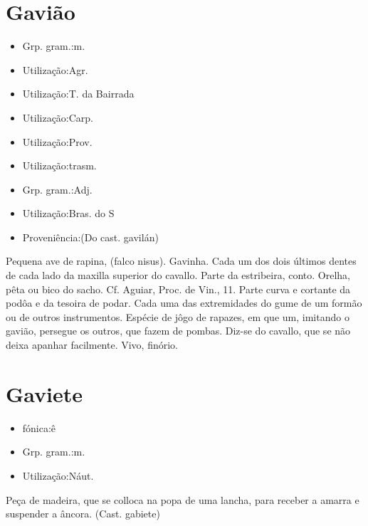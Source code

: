 \section{Gavião}
\begin{itemize}
\item {Grp. gram.:m.}
\end{itemize}
\begin{itemize}
\item {Utilização:Agr.}
\end{itemize}
\begin{itemize}
\item {Utilização:T. da Bairrada}
\end{itemize}
\begin{itemize}
\item {Utilização:Carp.}
\end{itemize}
\begin{itemize}
\item {Utilização:Prov.}
\end{itemize}
\begin{itemize}
\item {Utilização:trasm.}
\end{itemize}
\begin{itemize}
\item {Grp. gram.:Adj.}
\end{itemize}
\begin{itemize}
\item {Utilização:Bras. do S}
\end{itemize}
\begin{itemize}
\item {Proveniência:(Do cast. \textunderscore gavilán\textunderscore )}
\end{itemize}
Pequena ave de rapina, (\textunderscore falco nisus\textunderscore ).
Gavinha.
Cada um dos dois últimos dentes de cada lado da maxilla superior do cavallo.
Parte da estribeira, conto.
Orelha, pêta ou bico do sacho. Cf. Aguiar, \textunderscore Proc. de Vin.\textunderscore , 11.
Parte curva e cortante da podôa e da tesoira de podar.
Cada uma das extremidades do gume de um formão ou de outros instrumentos.
Espécie de jôgo de rapazes, em que um, imitando o gavião, persegue os outros, que fazem de pombas.
Diz-se do cavallo, que se não deixa apanhar facilmente.
Vivo, finório.
\section{Gaviete}
\begin{itemize}
\item {fónica:ê}
\end{itemize}
\begin{itemize}
\item {Grp. gram.:m.}
\end{itemize}
\begin{itemize}
\item {Utilização:Náut.}
\end{itemize}
Peça de madeira, que se colloca na popa de uma lancha, para receber a amarra e suspender a âncora.
(Cast. \textunderscore gabiete\textunderscore )
